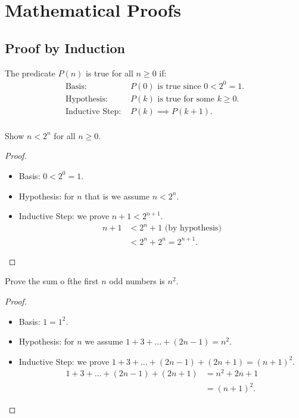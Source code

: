 \chapter[short]{Mathematical Proofs}
\section{Proof by Induction}

\begin{theorem}
    The predicate $P(n)$ is true for all $n \geq 0$ if:
    \begin{align}
        \text{Basis: }          & P(0) \text{ is true since } 0 < 2^0 = 1. \\
        \text{Hypothesis: }     & P(k) \text{ is true for some } k \geq 0. \\
        \text{Inductive Step: } & P(k) \implies P(k+1).                    \\
    \end{align}

\end{theorem}

\begin{example}
    Show $n < 2^n$ for all $n \geq 0$.
    \begin{proof}
        \begin{itemize}
            \item Basis: $0 < 2^0 = 1$.
            \item Hypothesis: for $n$ that is we assume $n < 2^n$.
            \item Inductive Step: we prove $n+1 < 2^{n+1}$.
                  \begin{align*}
                      n+1 & < 2^n + 1 \text{ (by hypothesis)} \\
                          & < 2^n + 2^n = 2^{n+1}.
                  \end{align*}
        \end{itemize}
    \end{proof}
\end{example}

\begin{example}
    Prove the sum o fthe first $n$ odd numbers is $n^2$.
    \begin{proof}
        \begin{itemize}
            \item Basis: $1 = 1^2$.
            \item Hypothesis: for $n$ we assume $1 + 3 + \ldots + (2n-1) = n^2$.
            \item Inductive Step: we prove $1 + 3 + \ldots + (2n-1) + (2n+1) = (n+1)^2$.
                  \begin{align*}
                      1 + 3 + \ldots + (2n-1) + (2n+1) & = n^2 + 2n + 1 \\
                                                       & = (n+1)^2.
                  \end{align*}
        \end{itemize}
    \end{proof}
\end{example}

